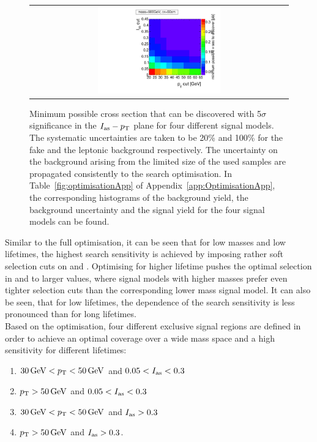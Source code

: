 \begin{figure}[!h]
\begin{tabular}{c}
    \includegraphics[width=0.49\textwidth]{figures/analysis/Optimisation/Madgraph_signal_mass_500_ctau_50cm_ECaloLe5_SOverDeltaBStatPlusSys.pdf} 
  \end{tabular}
  \caption{Minimum possible cross section that can be discovered with 5$\sigma$ significance in the $I_{\text{as}}-p_{\text{T}}$ plane for four different signal models.
           The systematic uncertainties are taken to be 20\% and 100\% for the fake and the leptonic background respectively.
           The uncertainty on the background arising from the limited size of the used samples are propagated consistently to the search optimisation.
           In Table~\ref{fig:optimisationApp} of Appendix~\ref{app:OptimisationApp}, the corresponding histograms of the background yield, the background uncertainty and the signal yield for the four signal models can be found.}
  \vspace{10pt}
  \label{fig:optimisation}
\end{figure}
Similar to the full optimisation, it can be seen that for low masses and low lifetimes, the highest search sensitivity is achieved by imposing rather soft selection cuts on \ias and \pt.
Optimising for higher lifetime pushes the optimal selection in \pt and \ias to larger values, where signal models with higher masses prefer even tighter \ias selection cuts than the corresponding lower mass signal model.
It can also be seen, that for low lifetimes, the \pt dependence of the search sensitivity is less pronounced than for long lifetimes.\\


Based on the optimisation, four different exclusive signal regions are defined in order to achieve an optimal coverage over a wide mass space and a high sensitivity for different lifetimes:
\begin{enumerate}[1.)]
\item $30\,\text{Ge}\kern-0.06667em\text{V}<p_{\text{T}}<50\,\text{Ge}\kern-0.06667em\text{V}$ and $0.05<I_{\text{as}}<0.3$
\item $p_{\text{T}}>50\,\text{Ge}\kern-0.06667em\text{V}$ and $0.05<I_{\text{as}}<0.3$
\item $30\,\text{Ge}\kern-0.06667em\text{V}<p_{\text{T}}<50\,\text{Ge}\kern-0.06667em\text{V}$ and $I_{\text{as}}>0.3$
\item $p_{\text{T}}>50\,\text{Ge}\kern-0.06667em\text{V}$ and $I_{\text{as}}>0.3$.
\end{enumerate}

